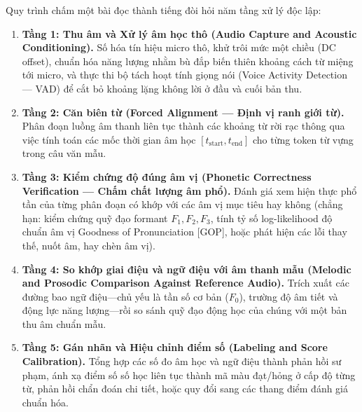 \documentclass[11pt,a4paper]{article}
\begin{document}
Quy trình chấm một bài đọc thành tiếng đòi hỏi năm tầng xử lý độc lập:
\begin{enumerate}
    \item \textbf{Tầng 1: Thu âm và Xử lý âm học thô (Audio Capture and Acoustic Conditioning).} Số hóa tín hiệu micro thô, khử trôi mức một chiều (DC offset), chuẩn hóa năng lượng nhằm bù đắp biến thiên khoảng cách từ miệng tới micro, và thực thi bộ tách hoạt tính giọng nói (Voice Activity Detection --- VAD) để cắt bỏ khoảng lặng không lời ở đầu và cuối bản thu.
    \item \textbf{Tầng 2: Căn biên từ (Forced Alignment --- Định vị ranh giới từ).} Phân đoạn luồng âm thanh liên tục thành các khoảng từ rời rạc thông qua việc tính toán các mốc thời gian âm học $[t_{\text{start}}, t_{\text{end}}]$ cho từng token từ vựng trong câu văn mẫu.
    \item \textbf{Tầng 3: Kiểm chứng độ đúng âm vị (Phonetic Correctness Verification --- Chấm chất lượng âm phổ).} Đánh giá xem hiện thực phổ tần của từng phân đoạn có khớp với các âm vị mục tiêu hay không (chẳng hạn: kiểm chứng quỹ đạo formant $F_1, F_2, F_3$, tính tỷ số log-likelihood độ chuẩn âm vị Goodness of Pronunciation [GOP], hoặc phát hiện các lỗi thay thế, nuốt âm, hay chèn âm vị).
    \item \textbf{Tầng 4: So khớp giai điệu và ngữ điệu với âm thanh mẫu (Melodic and Prosodic Comparison Against Reference Audio).} Trích xuất các đường bao ngữ điệu---chủ yếu là tần số cơ bản ($F_0$), trường độ âm tiết và động lực năng lượng---rồi so sánh quỹ đạo động học của chúng với một bản thu âm chuẩn mẫu.
    \item \textbf{Tầng 5: Gán nhãn và Hiệu chỉnh điểm số (Labeling and Score Calibration).} Tổng hợp các số đo âm học và ngữ điệu thành phản hồi sư phạm, ánh xạ điểm số số học liên tục thành mã màu đạt/hỏng ở cấp độ từng từ, phản hồi chẩn đoán chi tiết, hoặc quy đổi sang các thang điểm đánh giá chuẩn hóa.
\end{enumerate}
\end{document}
